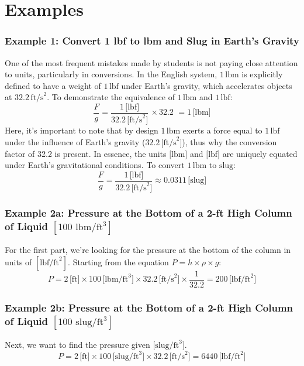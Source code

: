 \documentclass[12pt]{article}
\begin{document}
\newpage
\section*{Examples}
\subsubsection*{Example 1: Convert 1 lbf to lbm and Slug in Earth's Gravity}
One of the most frequent mistakes made by students is not paying close attention to units, particularly in conversions. In the English system, \(1 \, \text{lbm}\) is explicitly defined to have a weight of \(1 \, \text{lbf}\) under Earth's gravity, which accelerates objects at \(32.2 \, \text{ft/s}^2\).
\newline\newline
To demonstrate the equivalence of \(1 \, \text{lbm}\) and \(1 \, \text{lbf}\):
\[\frac{F}{g} = \frac{1 \, \text{[lbf]}}{32.2 \, \text{[ft/s}^2]} \, \times \text{32.2 } = 1 \, \text{[lbm]} \]
Here, it's important to note that by design \(1 \, \text{lbm}\) exerts a force equal to \(1 \, \text{lbf}\) under the influence of Earth's gravity (\(32.2 \, \text{[ft/s}^2]\)), thus why the conversion factor of 32.2 is present. In essence, the units \( \text{[lbm]} \) and \( \text{[lbf]} \) are uniquely equated under Earth's gravitational conditions.
\newline\newline
To convert \(1 \, \text{lbm}\) to \( \text{slug}\):
\[\frac{F}{g} = \frac{1 \, \text{[lbf]}}{32.2 \, \text{[ft/s}^2]} \approx 0.0311 \, \text{[slug]} \]
\subsubsection*{Example 2a: Pressure at the Bottom of a 2-ft High Column of Liquid $[100\text{ lbm}/\text{ft}^3]$}
For the first part, we're looking for the pressure at the bottom of the column in units of \([ \text{lbf/ft}^2 ]\). Starting from the equation \( P = h \times \rho \times g \):
\[ P = 2 \, \text{[ft]} \times 100 \, \text{[lbm/ft}^3] \times 32.2 \, \text{[ft/s}^2] \times \frac{1}{32.2}  = 200 \, \text{[lbf/ft}^2]\]
\subsubsection*{Example 2b: Pressure at the Bottom of a 2-ft High Column of Liquid $[100\text{ slug}/\text{ft}^3]$}
Next, we want to find the pressure given \( \text{[slug/ft}^3] \).
\[ P = 2 \, \text{[ft]} \times 100 \, \text{[slug/ft}^3] \times 32.2 \, \text{[ft/s}^2] = 6440 \, \text{[lbf/ft}^2] \]
\end{document}
